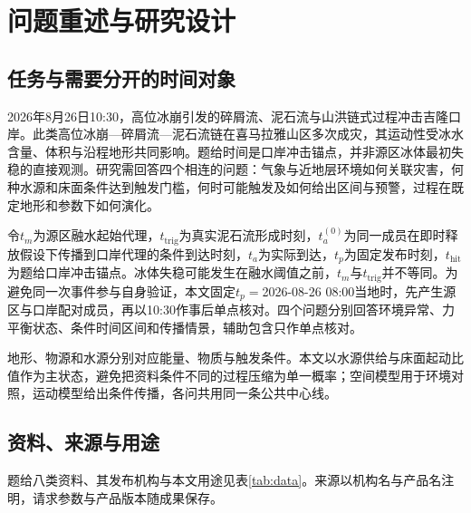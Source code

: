 \section{问题重述与研究设计}
\subsection{任务与需要分开的时间对象}
2026年8月26日10:30，高位冰崩引发的碎屑流、泥石流与山洪链式过程冲击吉隆口岸。此类高位冰崩—碎屑流—泥石流链在喜马拉雅山区多次成灾，其运动性受冰水含量、体积与沿程地形共同影响\cite{schneider2011,iverson1997,richardson2000}。题给时间是口岸冲击锚点，并非源区冰体最初失稳的直接观测。研究需回答四个相连的问题：气象与近地层环境如何关联灾害，何种水源和床面条件达到触发门槛，何时可能触发及如何给出区间与预警，过程在既定地形和参数下如何演化。

令$t_m$为源区融水起始代理，$t_{\mathrm{trig}}$为真实泥石流形成时刻，$t_a^{(0)}$为同一成员在即时释放假设下传播到口岸代理的条件到达时刻，$t_a$为实际到达，$t_p$为固定发布时刻，$t_{\mathrm{hit}}$为题给口岸冲击锚点。冰体失稳可能发生在融水阈值之前，$t_m$与$t_{\mathrm{trig}}$并不等同。为避免同一次事件参与自身验证，本文固定$t_p=$2026-08-26 08:00当地时，先产生源区与口岸配对成员，再以10:30作事后单点核对。四个问题分别回答环境异常、力平衡状态、条件时间区间和传播情景，辅助包含只作单点核对。

地形、物源和水源分别对应能量、物质与触发条件。本文以水源供给与床面起动比值作为主状态，避免把资料条件不同的过程压缩为单一概率；空间模型用于环境对照，运动模型给出条件传播，各问共用同一条公共中心线。

\subsection{资料、来源与用途}
题给八类资料、其发布机构与本文用途见表\ref{tab:data}。来源以机构名与产品名注明，请求参数与产品版本随成果保存。

